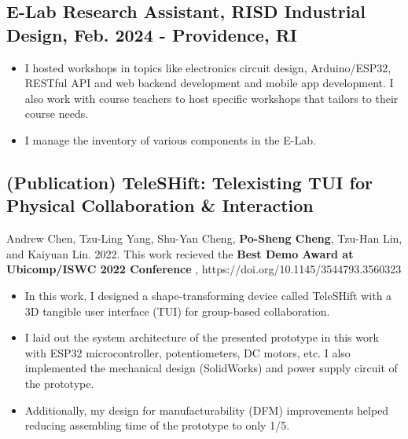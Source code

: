 \documentclass[12pt]{article}
\begin{document}
    \subsection*{E-Lab Research Assistant, RISD Industrial Design, Feb. 2024 -  \hfill Providence, RI}
        { \small
        \begin{itemize}
            \item I hosted workshops in topics like electronics circuit design, Arduino/ESP32, RESTful API and web backend development and mobile app development.
            I also work with course teachers to host specific workshops that tailors to their course needs.
            \item I manage the inventory of various components in the E-Lab.
        \end{itemize}
        }
    \subsection*{(Publication) TeleSHift: Telexisting TUI for Physical Collaboration \& Interaction}
    { \small
    {\scriptsize Andrew Chen, Tzu-Ling Yang, Shu-Yan Cheng, \textbf{Po-Sheng Cheng}, Tzu-Han Lin, and Kaiyuan Lin. 2022. This work recieved the \textbf{Best Demo Award at Ubicomp/ISWC 2022 Conference}%
    , https://doi.org/10.1145/3544793.3560323}
        \begin{itemize}
            \item In this work, I designed a shape-transforming device called TeleSHift with a 3D tangible user interface (TUI) for group-based collaboration.
            \item I laid out the system architecture of the presented prototype in this work with ESP32 microcontroller, potentiometers, DC motors, etc. I also implemented the mechanical design (SolidWorks) and power supply circuit of the prototype.
            \item Additionally, my design for manufacturability (DFM) improvements helped reducing assembling time of the prototype to only 1/5.
        \end{itemize}
        }
    
\end{document}

